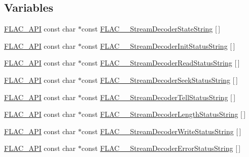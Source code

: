 \subsection*{Variables}
\begin{DoxyCompactItemize}
\item 
\mbox{\hyperlink{group__flac__export_ga56ca07df8a23310707732b1c0007d6f5}{F\+L\+A\+C\+\_\+\+A\+PI}} const char $\ast$const \mbox{\hyperlink{group__flac__stream__decoder_gae1c6a6fb59fce39e251233fa221fe61d}{F\+L\+A\+C\+\_\+\+\_\+\+Stream\+Decoder\+State\+String}} \mbox{[}$\,$\mbox{]}
\item 
\mbox{\hyperlink{group__flac__export_ga56ca07df8a23310707732b1c0007d6f5}{F\+L\+A\+C\+\_\+\+A\+PI}} const char $\ast$const \mbox{\hyperlink{group__flac__stream__decoder_ga34953a802ba44d861dcc8e9f2bb9d659}{F\+L\+A\+C\+\_\+\+\_\+\+Stream\+Decoder\+Init\+Status\+String}} \mbox{[}$\,$\mbox{]}
\item 
\mbox{\hyperlink{group__flac__export_ga56ca07df8a23310707732b1c0007d6f5}{F\+L\+A\+C\+\_\+\+A\+PI}} const char $\ast$const \mbox{\hyperlink{group__flac__stream__decoder_gadad9526cb960d7d0ac0ca19124d40b2a}{F\+L\+A\+C\+\_\+\+\_\+\+Stream\+Decoder\+Read\+Status\+String}} \mbox{[}$\,$\mbox{]}
\item 
\mbox{\hyperlink{group__flac__export_ga56ca07df8a23310707732b1c0007d6f5}{F\+L\+A\+C\+\_\+\+A\+PI}} const char $\ast$const \mbox{\hyperlink{group__flac__stream__decoder_gac793d777a3d5a63e735415b9bea5b20a}{F\+L\+A\+C\+\_\+\+\_\+\+Stream\+Decoder\+Seek\+Status\+String}} \mbox{[}$\,$\mbox{]}
\item 
\mbox{\hyperlink{group__flac__export_ga56ca07df8a23310707732b1c0007d6f5}{F\+L\+A\+C\+\_\+\+A\+PI}} const char $\ast$const \mbox{\hyperlink{group__flac__stream__decoder_ga907456321fb657036c7d5a48ef2adfa6}{F\+L\+A\+C\+\_\+\+\_\+\+Stream\+Decoder\+Tell\+Status\+String}} \mbox{[}$\,$\mbox{]}
\item 
\mbox{\hyperlink{group__flac__export_ga56ca07df8a23310707732b1c0007d6f5}{F\+L\+A\+C\+\_\+\+A\+PI}} const char $\ast$const \mbox{\hyperlink{group__flac__stream__decoder_ga434d91c0bf414d7c432bc6e761bdd55e}{F\+L\+A\+C\+\_\+\+\_\+\+Stream\+Decoder\+Length\+Status\+String}} \mbox{[}$\,$\mbox{]}
\item 
\mbox{\hyperlink{group__flac__export_ga56ca07df8a23310707732b1c0007d6f5}{F\+L\+A\+C\+\_\+\+A\+PI}} const char $\ast$const \mbox{\hyperlink{group__flac__stream__decoder_gae0c0c4f29a8524aedc58778504923297}{F\+L\+A\+C\+\_\+\+\_\+\+Stream\+Decoder\+Write\+Status\+String}} \mbox{[}$\,$\mbox{]}
\item 
\mbox{\hyperlink{group__flac__export_ga56ca07df8a23310707732b1c0007d6f5}{F\+L\+A\+C\+\_\+\+A\+PI}} const char $\ast$const \mbox{\hyperlink{group__flac__stream__decoder_gadc56befa033b67dd3befcd2f5f909ec1}{F\+L\+A\+C\+\_\+\+\_\+\+Stream\+Decoder\+Error\+Status\+String}} \mbox{[}$\,$\mbox{]}
\end{DoxyCompactItemize}


